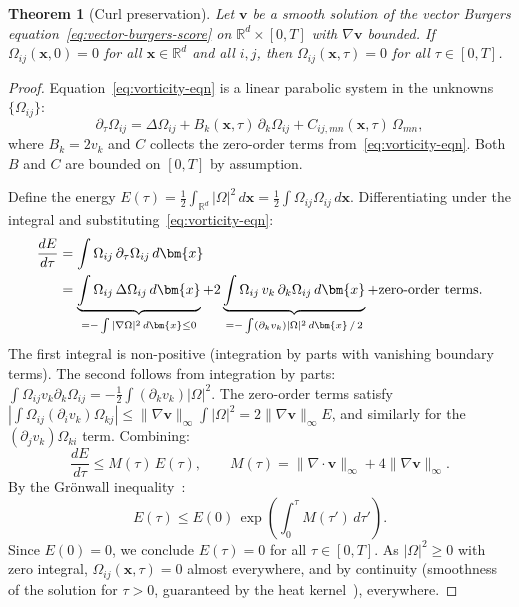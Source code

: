 \documentclass[11pt]{article}
\newtheorem{theorem}{Theorem}[section]
\newcommand{\R}{\mathbb{R}}
\begin{document}
\begin{theorem}[Curl preservation]\label{thm:curl-preservation}
Let $\bm{v}$ be a smooth solution of the vector Burgers equation~\eqref{eq:vector-burgers-score} on $\R^d \times [0,T]$ with $\nabla \bm{v}$ bounded.
If $\Omega_{ij}(\bm{x},0) = 0$ for all $\bm{x} \in \R^d$ and all $i,j$, then $\Omega_{ij}(\bm{x},\tau) = 0$ for all $\tau \in [0,T]$.
\end{theorem}

\begin{proof}
Equation~\eqref{eq:vorticity-eqn} is a linear parabolic system in the unknowns $\{\Omega_{ij}\}$:
\begin{equation}\label{eq:linear-parabolic}
  \partial_\tau \Omega_{ij} = \Delta \Omega_{ij} + B_k(\bm{x},\tau)\,\partial_k \Omega_{ij} + C_{ij,mn}(\bm{x},\tau)\,\Omega_{mn},
\end{equation}
where $B_k = 2v_k$ and $C$ collects the zero-order terms from~\eqref{eq:vorticity-eqn}.
Both $B$ and $C$ are bounded on $[0,T]$ by assumption.

Define the energy $E(\tau) = \tfrac{1}{2}\int_{\R^d} |\Omega|^2\,d\bm{x} = \tfrac{1}{2}\int \Omega_{ij}\Omega_{ij}\,d\bm{x}$.
Differentiating under the integral and substituting~\eqref{eq:vorticity-eqn}:
\begin{align}
  \frac{dE}{d\tau}
  &= \int \Omega_{ij}\,\partial_\tau\Omega_{ij}\,d\bm{x}\notag\\
  &= \underbrace{\int \Omega_{ij}\,\Delta\Omega_{ij}\,d\bm{x}}_{= -\int |\nabla\Omega|^2\,d\bm{x} \leq 0}
    + 2\underbrace{\int \Omega_{ij}\,v_k\,\partial_k\Omega_{ij}\,d\bm{x}}_{= -\int (\partial_k v_k)|\Omega|^2\,d\bm{x}\,/\,2}
    + \text{zero-order terms}.\label{eq:energy-est}
\end{align}
The first integral is non-positive (integration by parts with vanishing boundary terms).
The second follows from integration by parts: $\int \Omega_{ij} v_k \partial_k \Omega_{ij} = -\frac{1}{2}\int (\partial_k v_k)|\Omega|^2$.
The zero-order terms satisfy $|\int \Omega_{ij}(\partial_i v_k)\Omega_{kj}| \leq \|\nabla \bm{v}\|_\infty \int |\Omega|^2 = 2\|\nabla \bm{v}\|_\infty E$, and similarly for the $(\partial_j v_k)\Omega_{ki}$ term.
Combining:
\begin{equation}\label{eq:gronwall-energy}
  \frac{dE}{d\tau} \leq M(\tau)\,E(\tau),
  \qquad M(\tau) = \|\nabla \cdot \bm{v}\|_\infty + 4\|\nabla \bm{v}\|_\infty.
\end{equation}
By the Gr\"onwall inequality~\citep{gronwall1919note}:
\[
  E(\tau) \leq E(0)\,\exp\!\left(\int_0^\tau M(\tau')\,d\tau'\right).
\]
Since $E(0) = 0$, we conclude $E(\tau) = 0$ for all $\tau \in [0,T]$.
As $|\Omega|^2 \geq 0$ with zero integral, $\Omega_{ij}(\bm{x},\tau) = 0$ almost everywhere, and by continuity (smoothness of the solution for $\tau > 0$, guaranteed by the heat kernel~\citep{evans2010partial}), everywhere.
\end{proof}
\end{document}
